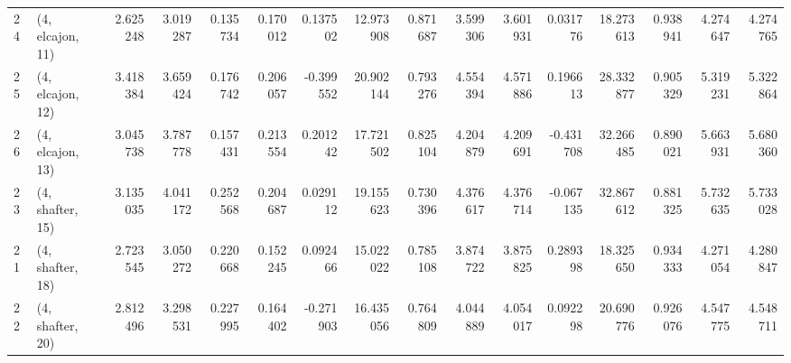 \begin{tabular}{llrrrrrrrrrrrrrr}
24 &  (4, elcajon, 11) &  2.625248 &   3.019287 &   0.135734 &  0.170012 &  0.137502 &   12.973908 &  0.871687 &   3.599306 &   3.601931 &  0.031776 &   18.273613 &  0.938941 &   4.274647 &   4.274765 \\
25 &  (4, elcajon, 12) &  3.418384 &   3.659424 &   0.176742 &  0.206057 & -0.399552 &   20.902144 &  0.793276 &   4.554394 &   4.571886 &  0.196613 &   28.332877 &  0.905329 &   5.319231 &   5.322864 \\
26 &  (4, elcajon, 13) &  3.045738 &   3.787778 &   0.157431 &  0.213554 &  0.201242 &   17.721502 &  0.825104 &   4.204879 &   4.209691 & -0.431708 &   32.266485 &  0.890021 &   5.663931 &   5.680360 \\
23 &  (4, shafter, 15) &  3.135035 &   4.041172 &   0.252568 &  0.204687 &  0.029112 &   19.155623 &  0.730396 &   4.376617 &   4.376714 & -0.067135 &   32.867612 &  0.881325 &   5.732635 &   5.733028 \\
21 &  (4, shafter, 18) &  2.723545 &   3.050272 &   0.220668 &  0.152245 &  0.092466 &   15.022022 &  0.785108 &   3.874722 &   3.875825 &  0.289398 &   18.325650 &  0.934333 &   4.271054 &   4.280847 \\
22 &  (4, shafter, 20) &  2.812496 &   3.298531 &   0.227995 &  0.164402 & -0.271903 &   16.435056 &  0.764809 &   4.044889 &   4.054017 &  0.092298 &   20.690776 &  0.926076 &   4.547775 &   4.548711 \\
\bottomrule
\end{tabular}
